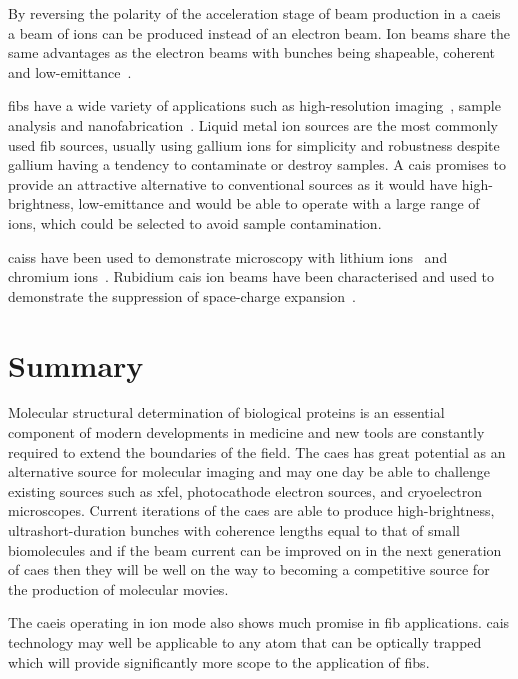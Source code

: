 By reversing the polarity of the acceleration stage of beam production in a \gls{caeis} a beam of ions can be produced instead of an electron beam.
Ion beams share the same advantages as the electron beams with bunches being shapeable, coherent and low-emittance~\cite{knuffman_cold_2013}.

\Glspl{fib} have a wide variety of applications such as high-resolution imaging~\cite{scipioni_helium_2008}, sample analysis and nanofabrication~\cite{khizroev_focused-ion-beam-based_2004}.
Liquid metal ion sources are the most commonly used \gls{fib} sources, usually using gallium ions for simplicity and robustness despite gallium having a tendency to contaminate or destroy samples.
A \gls{cais} promises to provide an attractive alternative to conventional sources as it would have high-brightness, low-emittance and would be able to operate with a large range of ions, which could be selected to avoid sample contamination.

\Glspl{cais} have been used to demonstrate microscopy with lithium ions~\cite{knuffman_nanoscale_2011} and chromium ions~\cite{steele_focused_2010}.
Rubidium \gls{cais} ion beams have been characterised and used to demonstrate the suppression of space-charge expansion~\cite{murphy_detailed_2014,thompson_suppression_2016}.

\section{Summary}

Molecular structural determination of biological proteins is an essential component of modern developments in medicine and new tools are constantly required to extend the boundaries of the field.
The \gls{caes} has great potential as an alternative source for molecular imaging and may one day be able to challenge existing sources such as \gls{xfel}, photocathode electron sources, and cryoelectron microscopes.
Current iterations of the \gls{caes} are able to produce high-brightness, ultrashort-duration bunches with coherence lengths equal to that of small biomolecules and if the beam current can be improved on in the next generation of \gls{caes} then they will be well on the way to becoming a competitive source for the production of molecular movies.

The \gls{caeis} operating in ion mode also shows much promise in \gls{fib} applications.
\Gls{cais} technology may well be applicable to any atom that can be optically trapped which will provide significantly more scope to the application of \glspl{fib}.

